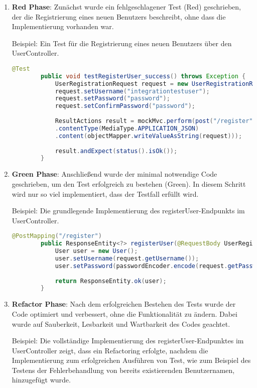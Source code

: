 \begin{enumerate}
	\item \textbf{Red Phase}: Zunächst wurde ein fehlgeschlagener Test (Red) geschrieben, der die Registrierung eines neuen Benutzers beschreibt, ohne dass die Implementierung vorhanden war.
	
	Beispiel: Ein Test für die Registrierung eines neuen Benutzers über den UserController.
	\begin{lstlisting}[language=Java]
		@Test
		public void testRegisterUser_success() throws Exception {
			UserRegistrationRequest request = new UserRegistrationRequest();
			request.setUsername("integrationtestuser");
			request.setPassword("password");
			request.setConfirmPassword("password");
			
			ResultActions result = mockMvc.perform(post("/register")
			.contentType(MediaType.APPLICATION_JSON)
			.content(objectMapper.writeValueAsString(request)));
			
			result.andExpect(status().isOk());
		}
	\end{lstlisting}
	
	\item \textbf{Green Phase}: Anschließend wurde der minimal notwendige Code geschrieben, um den Test erfolgreich zu bestehen (Green). In diesem Schritt wird nur so viel implementiert, dass der Testfall erfüllt wird.
	
	Beispiel: Die grundlegende Implementierung des registerUser-Endpunkts im UserController.
	
	\begin{lstlisting}[language=Java]
		@PostMapping("/register")
		public ResponseEntity<?> registerUser(@RequestBody UserRegistrationRequest request) {
			User user = new User();
			user.setUsername(request.getUsername());
			user.setPassword(passwordEncoder.encode(request.getPassword()));
			
			return ResponseEntity.ok(user);
		}
	\end{lstlisting}
	
	\item \textbf{Refactor Phase}: Nach dem erfolgreichen Bestehen des Tests wurde der Code optimiert und verbessert, ohne die Funktionalität zu ändern. Dabei wurde auf Sauberkeit, Lesbarkeit und Wartbarkeit des Codes geachtet.
	
	Beispiel: Die vollständige Implementierung des registerUser-Endpunktes im UserController zeigt, dass ein Refactoring erfolgte, nachdem die Implementierung zum erfolgreichen Ausführen von Test, wie zum Beispiel des Testens der Fehlerbehandlung von bereits existierenden Benutzernamen, hinzugefügt wurde.
	

\end{enumerate}
